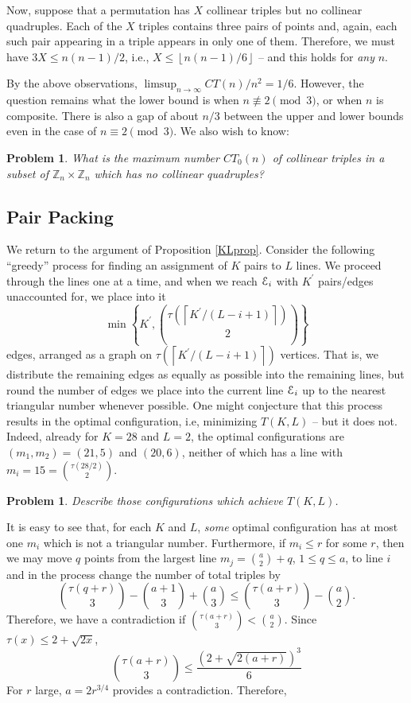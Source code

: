 \documentclass[12pt]{article}
\newtheorem{problem}[principle]{Problem}
\newcommand{\floor}[1]{\ensuremath{\left \lfloor {#1} \right \rfloor}}
\newcommand{\ceil}[1]{\ensuremath{\left \lceil {#1} \right \rceil}}
\newcommand{\Z}{{\mathbb Z}}
\newcommand{\cE}{{\cal E}}
\begin{document}
Now, suppose that a permutation has $X$ collinear triples but no collinear quadruples.  Each of the $X$ triples contains three pairs of points and, again, each such pair appearing in a triple appears in only one of them.  Therefore, we must have $3 X \leq n(n-1)/2$, i.e., $X \leq \floor{n(n-1)/6}$ -- and this holds for {\it any} $n$.

By the above observations, $\limsup_{n \rightarrow \infty} CT(n)/n^2 = 1/6$.  However, the question remains what the lower bound is when $n \not \equiv 2 \pmod{3}$, or when $n$ is composite.  There is also a gap of about $n/3$ between the upper and lower bounds even in the case of $n \equiv 2 \pmod{3}$.  We also wish to know:

\begin{problem} What is the maximum number $CT_0(n)$ of collinear triples in a subset of $\Z_n \times \Z_n$ which has no collinear quadruples?
\end{problem}

\subsection{Pair Packing}

We return to the argument of Proposition \ref{KLprop}.  Consider the following ``greedy'' process for finding an assignment of $K$ pairs to $L$ lines.  We proceed through the lines one at a time, and when we reach $\cE_i$ with $K^\prime$ pairs/edges unaccounted for, we place into it
$$
\min\left \{K^\prime, \binom{\tau(\ceil{K^\prime/(L-i+1)})}{2} \right \}
$$
edges, arranged as a graph on $\tau(\ceil{K^\prime/(L-i+1)})$ vertices.  That is, we distribute the remaining edges as equally as possible into the remaining lines, but round the number of edges we place into the current line $\cE_i$ up to the nearest triangular number whenever possible.  One might conjecture that this process results in the optimal configuration, i.e, minimizing $T(K,L)$ -- but it does not.  Indeed, already for $K = 28$ and $L=2$, the optimal configurations are $(m_1,m_2) = (21,5)$ and $(20,6)$, neither of which has a line with $m_i = 15 = \binom{\tau(28/2)}{2}$.

\begin{problem} \label{prob3} Describe those configurations which achieve $T(K,L)$.
\end{problem}

It is easy to see that, for each $K$ and $L$, {\it some} optimal configuration has at most one $m_i$ which is not a triangular number.  Furthermore, if $m_i \leq r$ for some $r$, then we may move $q$ points from the largest line $m_j = \binom{a}{2} + q$, $1 \leq q \leq a$, to line $i$ and in the process change the number of total triples by
$$
\binom{\tau(q+r)}{3} - \binom{a+1}{3} + \binom{a}{3} \leq \binom{\tau(a+r)}{3} - \binom{a}{2}.
$$
Therefore, we have a contradiction if $\binom{\tau(a+r)}{3} < \binom{a}{2}$.  Since $\tau(x) \leq 2 + \sqrt{2x}$,
$$
\binom{\tau(a+r)}{3} \leq \frac{(2 + \sqrt{2(a+r)})^3}{6}
$$
For $r$ large, $a = 2 r^{3/4}$ provides a contradiction.  Therefore,
\end{document}
